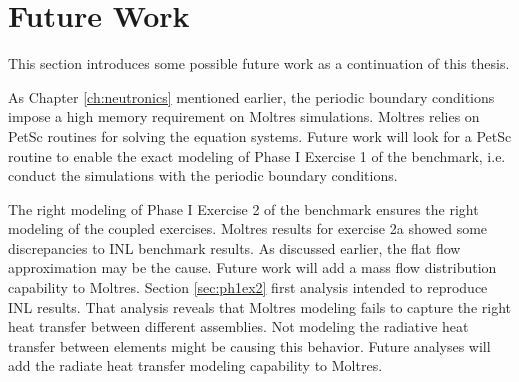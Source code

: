 \section{Future Work}
\label{sec:futwork}

This section introduces some possible future work as a continuation of this thesis.

As Chapter \ref{ch:neutronics} mentioned earlier, the periodic boundary conditions impose a high memory requirement on Moltres simulations.
Moltres relies on PetSc routines for solving the equation systems.
Future work will look for a PetSc routine to enable the exact modeling of Phase I Exercise 1 of the benchmark, i.e. conduct the simulations with the periodic boundary conditions.

The right modeling of Phase I Exercise 2 of the benchmark ensures the right modeling of the coupled exercises.
Moltres results for exercise 2a showed some discrepancies to INL benchmark results.
As discussed earlier, the flat flow approximation may be the cause.
Future work will add a mass flow distribution capability to Moltres.
Section \ref{sec:ph1ex2} first analysis intended to reproduce INL results.
That analysis reveals that Moltres modeling fails to capture the right heat transfer between different assemblies.
Not modeling the radiative heat transfer between elements might be causing this behavior.
Future analyses will add the radiate heat transfer modeling capability to Moltres.




